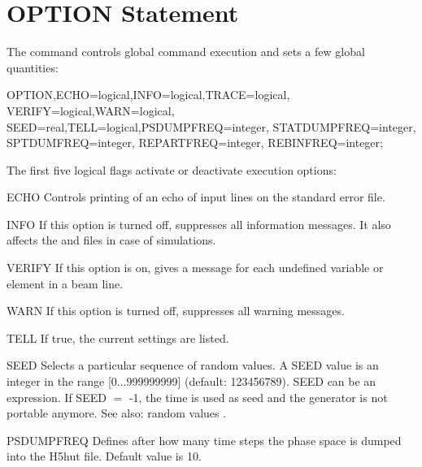 \section{OPTION Statement}
\label{sec:option}
The  command controls global command execution and sets
a few global quantities:
\begin{example}
OPTION,ECHO=logical,INFO=logical,TRACE=logical,
       VERIFY=logical,WARN=logical,
       SEED=real,TELL=logical,PSDUMPFREQ=integer,
       STATDUMPFREQ=integer, SPTDUMFREQ=integer,
       REPARTFREQ=integer, REBINFREQ=integer;
\end{example}
The first five logical flags activate or deactivate execution options:
\begin{kdescription}
  \item[ECHO]
  Controls printing of an echo of input lines on the standard error file.

  \item[INFO]
  If this option is turned off, \opal suppresses all information messages. It also affects the  and   files in case of \opalcycl simulations.

  \item[VERIFY]
  If this option is on, \opal gives a message for each undefined variable
  or element in a beam line.

  \item[WARN]
  If this option is turned off, \opal suppresses all warning messages.

  \item[TELL]
  If true, the current settings are listed.

  \item[SEED]
  Selects a particular sequence of random values.
  A SEED value is an integer in the range [0...999999999] (default: 123456789).
  SEED can be an expression. If SEED $=$ -1, the time is used as seed and the generator is not portable anymore.
  See also: random values .

  \item[PSDUMPFREQ]
  Defines after how many time steps the phase space is dumped into the H5hut file. Default value is 10.


\end{kdescription}
